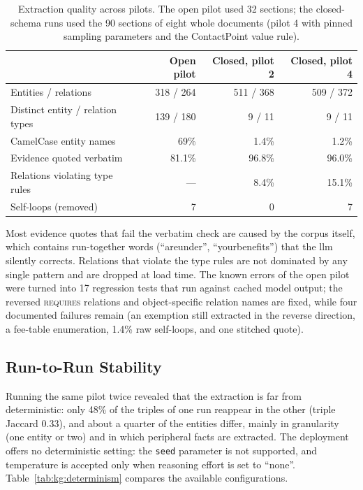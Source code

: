 \begin{table}[ht]
    \centering
    \small
    \caption{Extraction quality across pilots. The open pilot used 32 sections; the
             closed-schema runs used the 90 sections of eight whole documents
             (pilot 4 with pinned sampling parameters and the ContactPoint value
             rule).}
    \label{tab:kg:pilots}
    \begin{tabular}{lrrr}
        \toprule
        & Open pilot & Closed, pilot 2 & Closed, pilot 4 \\
        \midrule
        Entities / relations              & 318 / 264 & 511 / 368 & 509 / 372 \\
        Distinct entity / relation types  & 139 / 180 & 9 / 11 & 9 / 11 \\
        CamelCase entity names            & 69\%  & 1.4\% & 1.2\% \\
        Evidence quoted verbatim          & 81.1\% & 96.8\% & 96.0\% \\
        Relations violating type rules    & ---   & 8.4\% & 15.1\% \\
        Self-loops (removed)              & 7     & 0 & 7 \\
        \bottomrule
    \end{tabular}
\end{table}

Most evidence quotes that fail the verbatim check are caused by the corpus itself,
which contains run-together words (``areunder'', ``yourbenefits'') that the
\gls{llm} silently corrects. Relations that violate the type rules are not
dominated by any single pattern and are dropped at load time. The known errors of
the open pilot were turned into 17 regression tests that run against cached model
output; the reversed \textsc{requires} relations and object-specific relation names
are fixed, while four documented failures remain (an exemption still extracted in
the reverse direction, a fee-table enumeration, 1.4\% raw self-loops, and one
stitched quote).

\subsection{Run-to-Run Stability}

Running the same pilot twice revealed that the extraction is far from
deterministic: only 48\% of the triples of one run reappear in the other (triple
Jaccard 0.33), and about a quarter of the entities differ, mainly in granularity
(one entity or two) and in which peripheral facts are extracted. The deployment
offers no deterministic setting: the \texttt{seed} parameter is not supported, and
temperature is accepted only when reasoning effort is set to ``none''.
Table~\ref{tab:kg:determinism} compares the available configurations.

